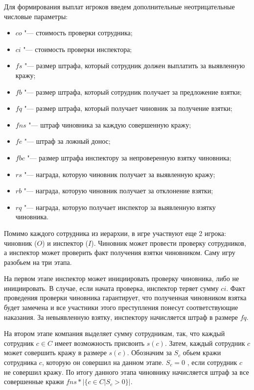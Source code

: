 \par
Для формирования выплат игроков введем дополнительные неотрицательные числовые параметры:
\begin{itemize}
	\item $co$ "--- стоимость проверки сотрудника;
	\item $ci$ "--- стоимость проверки инспектора;
	\item $fs$ "--- размер штрафа, который сотрудник должен выплатить за выявленную кражу;
	\item $fb$ "--- размер штрафа, который сотрудник получает за предложение взятки;
	\item $fq$ "--- размер штрафа, который получает чиновник за получение взятки;
	\item $fns$ "--- штраф чиновника за каждую совершенную кражу;
	\item $fe$ "--- штраф за ложный донос;
	\item $fbc$ "--- размер штрафа инспектору за непроверенную взятку чиновника;
	\item $rs$ "--- награда, которую чиновник получает за выявленную кражу;
	\item $rb$ "--- награда, которую чиновник получает за отклонение взятки;
	\item $rq$ "--- награда, которую получает инспектор за выявленную взятку чиновника.
\end{itemize} 
\par
Помимо каждого сотрудника из иерархии, в игре участвуют еще 2 игрока: чиновник ($O$) и инспектор ($I$). Чиновник может провести проверку сотрудников, а инспектор может проверить факт получения взятки чиновником. Саму игру разобьем на три этапа.
\par
На первом этапе инспектор может инициировать проверку чиновника, либо не инициировать. В случае, если начата проверка, инспектор теряет сумму $ci$. Факт проведения проверки чиновника гарантирует, что полученная чиновником взятка будет замечена и все участники этого преступления понесут соответствующие наказания. За невыявленную взятку, инспектору начисляется штраф в размере $fq$.
\par
На втором этапе компания выделяет сумму сотрудникам, так, что каждый сотрудник $c \in C$ имеет возможность присвоить $s(c)$. Затем, каждый сотрудник $c$ может совершить кражу в размере $s(c)$. Обозначим за $S_c$ обьем кражи сотрудника $c$, которую он совершил на данном этапе. $S_c = 0$ , если сотрудник $c$ не совершил кражу. По итогу данного этапа чиновнику начисляется штраф за все совершенные кражи $fns*\bigl|\{c\in C| S_c > 0\}\bigl| $.
